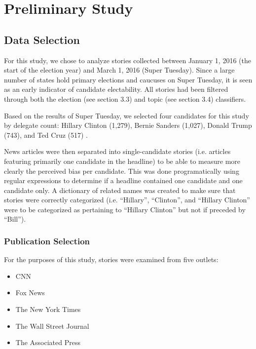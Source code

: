 \chapter{Preliminary Study}


\section {Data Selection} 

For this study, we chose to analyze stories collected between January 1, 2016 (the start of the election year) and March 1, 2016 (Super Tuesday). Since a large number of states hold primary elections and caucuses on Super Tuesday, it is seen as an early indicator of candidate electability. All stories had been filtered through both the election (see section 3.3) and topic (see section 3.4) classifiers.

Based on the results of Super Tuesday, we selected four candidates for this study by delegate count: Hillary Clinton (1,279), Bernie Sanders (1,027), Donald Trump (743), and Ted Cruz (517) \cite{March45online}.

News articles were then separated into single-candidate stories (i.e. articles featuring primarily one candidate in the headline) to be able to measure more clearly the perceived bias per candidate. This was done programatically using regular expressions to determine if a headline contained one candidate and one candidate only. A dictionary of related names was created to make sure that stories were correctly categorized (i.e. ``Hillary'', ``Clinton'', and ``Hillary Clinton'' were to be categorized as pertaining to ``Hillary Clinton'' but not if preceded by ``Bill'').

\subsection {Publication Selection}

For the purposes of this study, stories were examined from five outlets: 

\begin{itemize}
\itemsep-1em 
  \item CNN
  \item Fox News  
  \item The New York Times
  \item The Wall Street Journal 
  \item The Associated Press 
\end{itemize}

